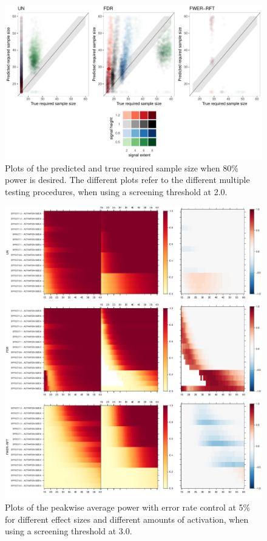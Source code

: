 \begin{center}
\begin{figure}[h]
\includegraphics[scale=0.35]{figures/FIG_SIM_sscalc_15_NOMASK_2_0.pdf}
\caption{Plots of the predicted and true required sample size when 80\% power is desired. The different plots refer to the different multiple testing procedures, when using a screening threshold at 2.0.}
\end{figure}
\end{center}

\begin{center}
\begin{figure}[h]
\includegraphics[scale=0.25]{figures/FIG_SIM_power_15_NOMASK_3_0.pdf}
\caption{Plots of the peakwise average power with error rate control at 5\% for different effect sizes and different amounts of activation, when using a screening threshold at 3.0.}
\end{figure}
\end{center}


